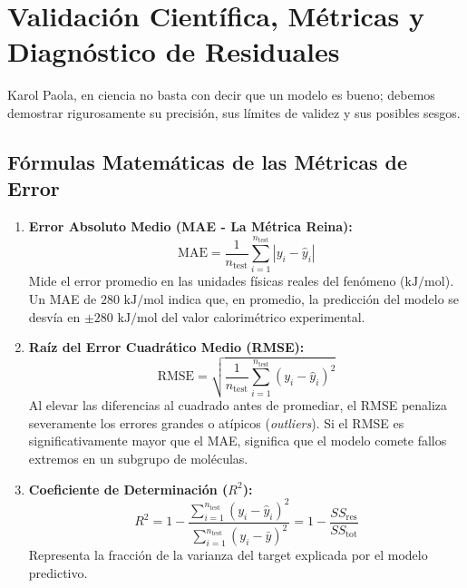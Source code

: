 \documentclass[11pt,letterpaper]{report}
\begin{document}
\newpage

\chapter{Validación Científica, Métricas y Diagnóstico de Residuales}

Karol Paola, en ciencia no basta con decir que un modelo es bueno; debemos demostrar rigurosamente su precisión, sus límites de validez y sus posibles sesgos.

\section{Fórmulas Matemáticas de las Métricas de Error}

\begin{enumerate}[leftmargin=*]
    \item \textbf{Error Absoluto Medio (MAE - La Métrica Reina):}
    \begin{equation}
        \text{MAE} = \frac{1}{n_{\text{test}}} \sum_{i=1}^{n_{\text{test}}} |y_i - \hat{y}_i|
    \end{equation}
    Mide el error promedio en las unidades físicas reales del fenómeno ($\text{kJ/mol}$). Un MAE de $280\text{ kJ/mol}$ indica que, en promedio, la predicción del modelo se desvía en $\pm 280\text{ kJ/mol}$ del valor calorimétrico experimental.
    \item \textbf{Raíz del Error Cuadrático Medio (RMSE):}
    \begin{equation}
        \text{RMSE} = \sqrt{\frac{1}{n_{\text{test}}} \sum_{i=1}^{n_{\text{test}}} (y_i - \hat{y}_i)^2}
    \end{equation}
    Al elevar las diferencias al cuadrado antes de promediar, el RMSE penaliza severamente los errores grandes o atípicos (\textit{outliers}). Si el RMSE es significativamente mayor que el MAE, significa que el modelo comete fallos extremos en un subgrupo de moléculas.
    \item \textbf{Coeficiente de Determinación ($R^2$):}
    \begin{equation}
        R^2 = 1 - \frac{\sum_{i=1}^{n_{\text{test}}} (y_i - \hat{y}_i)^2}{\sum_{i=1}^{n_{\text{test}}} (y_i - \bar{y})^2} = 1 - \frac{SS_{\text{res}}}{SS_{\text{tot}}}
    \end{equation}
    Representa la fracción de la varianza del target explicada por el modelo predictivo.
\end{enumerate}
\end{document}
